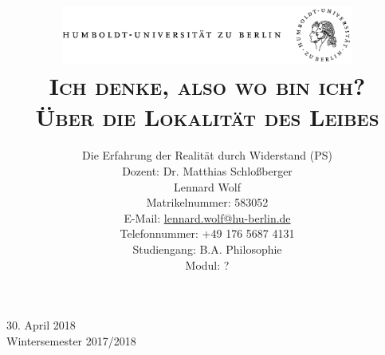\documentclass[a4paper, 12pt]{article}
\date{\vspace{-3ex}}
\begin{document}
\title{\vspace{5ex}
	\includegraphics*[bb=0 0 720 200, width=0.72\textwidth]{ErstesSem/images/hu_logo.png}\\
	\vspace{30pt}
	\scshape\LARGE{Ich denke, also wo bin ich?
}\\\vspace{5pt}\Large{Über die Lokalität des Leibes}\\\vspace{20pt}}
	


\author{Die Erfahrung der Realität durch Widerstand (PS)\\
	\vspace{7pt}
          Dozent: Dr. Matthias Schloßberger\\\vspace{4pt}Lennard Wolf\\
        \small{Matrikelnummer: 583052}\\
        \small{E-Mail: \href{mailto:lennard.wolf@hu-berlin.de}{lennard.wolf@hu-berlin.de}}\\
        \small{Telefonnummer: +49 176 5687 4131}\\
        \small{Studiengang: B.A. Philosophie}\\
        \small{Modul: ?}}

\maketitle

\vspace{\fill}

\begin{minipage}[]{0.92\textwidth}
    \centering
    \onehalfspacing
    \large   
    30. April 2018\\
    Wintersemester 2017/2018

    \vspace{-20mm} 
\end{minipage}%
\thispagestyle{empty}
\newpage
\setcounter{page}{1}
\end{document}
